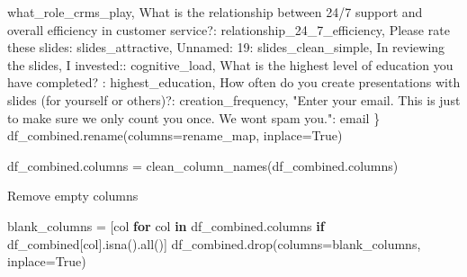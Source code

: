 \documentclass[
  letterpaper,
  DIV=11,
  numbers=noendperiod]{scrartcl}
\newenvironment{Shaded}{\begin{snugshade}}{\end{snugshade}}
\newcommand{\BuiltInTok}[1]{\textcolor[rgb]{0.00,0.23,0.31}{#1}}
\newcommand{\ControlFlowTok}[1]{\textcolor[rgb]{0.00,0.23,0.31}{\textbf{#1}}}
\newcommand{\KeywordTok}[1]{\textcolor[rgb]{0.00,0.23,0.31}{\textbf{#1}}}
\newcommand{\NormalTok}[1]{\textcolor[rgb]{0.00,0.23,0.31}{#1}}
\newcommand{\OperatorTok}[1]{\textcolor[rgb]{0.37,0.37,0.37}{#1}}
\newcommand{\StringTok}[1]{\textcolor[rgb]{0.13,0.47,0.30}{#1}}
\newcommand{\VariableTok}[1]{\textcolor[rgb]{0.07,0.07,0.07}{#1}}
\begin{document}
\begin{Shaded}
\begin{Highlighting}[]
      \StringTok{\textquotesingle{}what\_role\_crms\_play\textquotesingle{}}\NormalTok{,}
    \StringTok{\textquotesingle{}What is the relationship between 24/7 support and overall efficiency in customer service?\textquotesingle{}}\NormalTok{: }
      \StringTok{\textquotesingle{}relationship\_24\_7\_efficiency\textquotesingle{}}\NormalTok{,}
    \StringTok{\textquotesingle{}Please rate these slides\textquotesingle{}}\NormalTok{: }
      \StringTok{\textquotesingle{}slides\_attractive\textquotesingle{}}\NormalTok{,}
    \StringTok{\textquotesingle{}Unnamed: 19\textquotesingle{}}\NormalTok{: }
      \StringTok{\textquotesingle{}slides\_clean\_simple\textquotesingle{}}\NormalTok{,}
    \StringTok{\textquotesingle{}In reviewing the slides, I invested:\textquotesingle{}}\NormalTok{: }
      \StringTok{\textquotesingle{}cognitive\_load\textquotesingle{}}\NormalTok{,}
    \StringTok{\textquotesingle{}What is the highest level of education you have completed?  \textquotesingle{}}\NormalTok{: }
      \StringTok{\textquotesingle{}highest\_education\textquotesingle{}}\NormalTok{,}
    \StringTok{\textquotesingle{}How often do you create presentations with slides (for yourself or others)?\textquotesingle{}}\NormalTok{: }
      \StringTok{\textquotesingle{}creation\_frequency\textquotesingle{}}\NormalTok{,}
    \StringTok{"Enter your email. This is just to make sure we only count you once. We won\textquotesingle{}t spam you."}\NormalTok{: }\StringTok{\textquotesingle{}email\textquotesingle{}}
\NormalTok{\}}
\NormalTok{df\_combined.rename(columns}\OperatorTok{=}\NormalTok{rename\_map, inplace}\OperatorTok{=}\VariableTok{True}\NormalTok{)}

\NormalTok{df\_combined.columns }\OperatorTok{=}\NormalTok{ clean\_column\_names(df\_combined.columns)}
\end{Highlighting}
\end{Shaded}

Remove empty columns

\begin{Shaded}
\begin{Highlighting}[]
\NormalTok{blank\_columns }\OperatorTok{=}\NormalTok{ [col }\ControlFlowTok{for}\NormalTok{ col }\KeywordTok{in}\NormalTok{ df\_combined.columns }\ControlFlowTok{if}\NormalTok{ df\_combined[col].isna().}\BuiltInTok{all}\NormalTok{()]}
\NormalTok{df\_combined.drop(columns}\OperatorTok{=}\NormalTok{blank\_columns, inplace}\OperatorTok{=}\VariableTok{True}\NormalTok{)}
\end{Highlighting}
\end{Shaded}
\end{document}
